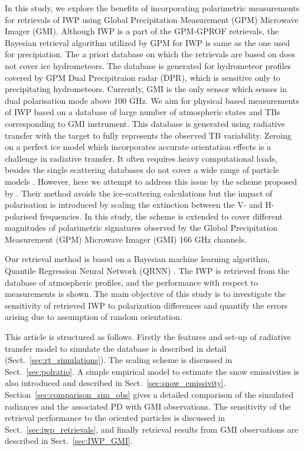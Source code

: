 \documentclass[amt, manuscript]{copernicus}
\begin{document}



In this study, we explore the benefits of incorporating polarimetric measurements for retrievals of IWP using Global Precipitation Measurement (GPM) Microwave Imager (GMI). Although IWP is a part of the GPM-GPROF retrievals, the Bayesian retrieval algorithm utilized by GPM for IWP is same as the one used for precipiation. The a priori database on which the retrievals are based on does not cover ice hydrometeors. The database is generated for hydrometeor profiles covered by GPM Dual Precipitraion radar (DPR), which is sensitive only to precipitating hydrometeors. Currently, GMI is the only sensor which senses in dual polarisation mode above 100\,\,GHz. We aim for physical based measurements of IWP based on a database of large number of atmospheric states and TBs corresponding to GMI instrument. This database is generated using radiative transfer with the target to fully represents the observed TB variability. Zeroing on a perfect ice model which incorporates accurate orientation effects is a challenge in radiative transfer. It often requires heavy computational loads, besides the single scattering databases do not cover a wide range of particle models \citep{brath:micro:20}. However, here we attempt to address this issue by the scheme proposed by \citet{barlakas:intro:21}. Their method avoids the ice-scattering calculations but the impact of polarisation is introduced by scaling the extinction between the V- and H- polarised frequencies. In this study, the scheme is extended to cover different magnitudes of polarimetric signatures observed by the Global Precipitation Measurement (GPM) Microwave Imager (GMI) 166\,\,GHz channels. 

Our retrieval method is based on a Bayesian machine learning algorithm, Quantile Regression Neural Network (QRNN) \citep{pfreundschuh:aneur:18}. The IWP is retrieved from the database of atmospheric profiles, and the performance with respect to measurements is shown. The main objective of this study is to investigate the sensitivity of retrieved IWP to polarization differences and  quantify the errors arising due to assumption of random orientation.

This article is structured as follows. Firstly the features and  set-up of radiative transfer model to simulate the database is described in detail (Sect.~\ref{sec:rt_simulations}). The scaling scheme is discussed in Sect.~\ref{sec:polratio}. A simple empirical model to estimate the snow emissivities is also introduced and described in Sect.~\ref{sec:snow_emissivity}. Section~\ref{sec:comparison_sim_obs} gives a detailed comparison of the simulated radiances and the associated PD with GMI observations. The sensitivity of the retrieval performance to the oriented particles is discussed in Sect.~\ref{sec:iwp_retrievals}, and finally retrieval results from GMI observations are described in Sect.~\ref{sec:IWP_GMI}.
 
\end{document}
